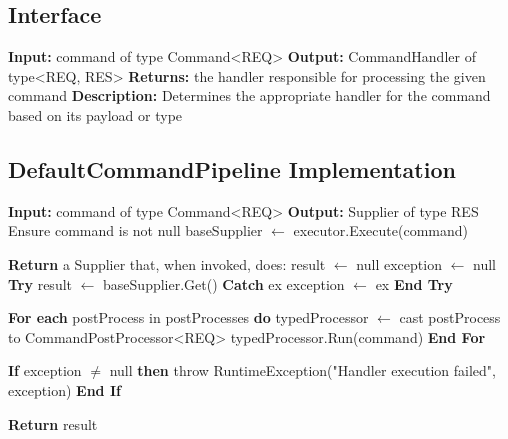 \documentclass{article}
\begin{document}
\subsection{Interface}
\begin{algorithm}
\caption{CommandRouter Interface}
\begin{algorithmic}[1]
    \State \textbf{Input:} command of type Command\textless REQ\textgreater
    \State \textbf{Output:} CommandHandler of type\textless REQ, RES\textgreater
    \State \textbf{Returns:} the handler responsible for processing the given command
    \State \textbf{Description:} Determines the appropriate handler for the command based on its payload or type
\EndProcedure
\end{algorithmic}
\end{algorithm}

\subsection{DefaultCommandPipeline Implementation}
\begin{algorithm}
\caption{DefaultCommandPipeline Implementation}
\begin{algorithmic}[1]

    \State \textbf{Input:} command of type Command\textless REQ\textgreater
    \State \textbf{Output:} Supplier of type RES
    \State Ensure command is not null
    \State baseSupplier $\gets$ executor.Execute(command) 

    \State \textbf{Return} a Supplier that, when invoked, does:
    \State \quad result $\gets$ null
    \State \quad exception $\gets$ null
    \State \quad \textbf{Try}
    \State \quad \quad result $\gets$ baseSupplier.Get() 
    \State \quad \textbf{Catch} ex
    \State \quad \quad exception $\gets$ ex
    \State \quad \textbf{End Try}

    \State \quad \textbf{For each} postProcess in postProcesses \textbf{do}
    \State \quad \quad typedProcessor $\gets$ cast postProcess to CommandPostProcessor\textless REQ\textgreater
    \State \quad \quad typedProcessor.Run(command) 
    \State \quad \textbf{End For}

    \State \quad \textbf{If} exception $\neq$ null \textbf{then}
    \State \quad \quad throw RuntimeException("Handler execution failed", exception)
    \State \quad \textbf{End If}

    \State \quad \textbf{Return} result
\EndProcedure

\end{algorithmic}
\end{algorithm}
\end{document}
